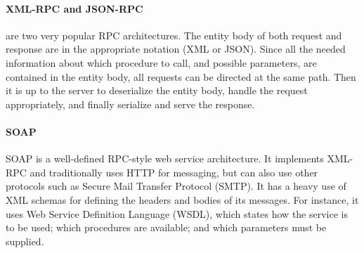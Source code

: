 \paragraph{XML-RPC and JSON-RPC} are two very popular RPC architectures.
The entity body of both request and response are in the appropriate notation (XML or JSON).
Since all the needed information about which procedure to call, and possible parameters, are contained in the entity body, all requests can be directed at the same path.
Then it is up to the server to deserialize the entity body, handle the request appropriately, and finally serialize and serve the response.

\paragraph{SOAP}
SOAP is a well-defined RPC-style web service architecture.
It implements XML-RPC and traditionally uses HTTP for messaging, but can also use other protocols such as Secure Mail Transfer Protocol (SMTP).
It has a heavy use of XML schemas for defining the headers and bodies of its messages.
For instance, it uses Web Service Definition Language (WSDL), which states how the service is to be used; which procedures are available; and which parameters must be supplied.
